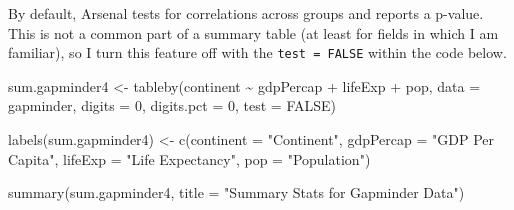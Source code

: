 \documentclass[
]{book}
\makeatletter
\newenvironment{Shaded}{\begin{snugshade}}{\end{snugshade}}
\newcommand{\AttributeTok}[1]{\textcolor[rgb]{0.61,0.61,0.61}{#1}}
\newcommand{\ConstantTok}[1]{\textcolor[rgb]{0,0,0}{#1}}
\newcommand{\DecValTok}[1]{\textcolor[rgb]{0.06,0.06,0.06}{#1}}
\newcommand{\FunctionTok}[1]{\textcolor[rgb]{0,0,0}{#1}}
\newcommand{\NormalTok}[1]{#1}
\newcommand{\OtherTok}[1]{\textcolor[rgb]{0.37,0.37,0.37}{#1}}
\newcommand{\SpecialCharTok}[1]{\textcolor[rgb]{0,0,0}{#1}}
\newcommand{\StringTok}[1]{\textcolor[rgb]{0.5,0.5,0.5}{#1}}
\newenvironment{kframe}{%
\medskip{}
\setlength{\fboxsep}{.8em}
 \def\at@end@of@kframe{}%
 \ifinner\ifhmode%
  \def\at@end@of@kframe{\end{minipage}}%
  \begin{minipage}{\columnwidth}%
 \fi\fi%
 \def\FrameCommand##1{\hskip\@totalleftmargin \hskip-\fboxsep
 \colorbox{shadecolor}{##1}\hskip-\fboxsep
     \hskip-\linewidth \hskip-\@totalleftmargin \hskip\columnwidth}%
 \MakeFramed {\advance\hsize-\width
   \@totalleftmargin\z@ \linewidth\hsize
   \@setminipage}}%
 {\par\unskip\endMakeFramed%
 \at@end@of@kframe}
\renewenvironment{Shaded}{\begin{kframe}}{\end{kframe}}
\makeatother
\begin{document}
By default, Arsenal tests for correlations across groups and reports a p-value. This is not a common part of a summary table (at least for fields in which I am familiar), so I turn this feature off with the \texttt{test\ =\ FALSE} within the code below.

\begin{Shaded}
\begin{Highlighting}[]
\NormalTok{sum.gapminder4 }\OtherTok{\textless{}{-}} \FunctionTok{tableby}\NormalTok{(continent }\SpecialCharTok{\textasciitilde{}}\NormalTok{ gdpPercap }\SpecialCharTok{+}\NormalTok{ lifeExp }\SpecialCharTok{+}\NormalTok{ pop, }\AttributeTok{data =}\NormalTok{ gapminder, }\AttributeTok{digits =} \DecValTok{0}\NormalTok{, }\AttributeTok{digits.pct =} \DecValTok{0}\NormalTok{, }\AttributeTok{test =} \ConstantTok{FALSE}\NormalTok{)}

\FunctionTok{labels}\NormalTok{(sum.gapminder4) }\OtherTok{\textless{}{-}} \FunctionTok{c}\NormalTok{(}\AttributeTok{continent =} \StringTok{"Continent"}\NormalTok{, }\AttributeTok{gdpPercap =} \StringTok{"GDP Per Capita"}\NormalTok{, }\AttributeTok{lifeExp =} \StringTok{"Life Expectancy"}\NormalTok{, }\AttributeTok{pop =} \StringTok{"Population"}\NormalTok{)}
\end{Highlighting}
\end{Shaded}

\begin{Shaded}
\begin{Highlighting}[]
\FunctionTok{summary}\NormalTok{(sum.gapminder4, }\AttributeTok{title =} \StringTok{"Summary Stats for Gapminder Data"}\NormalTok{)}
\end{Highlighting}
\end{Shaded}
\end{document}
